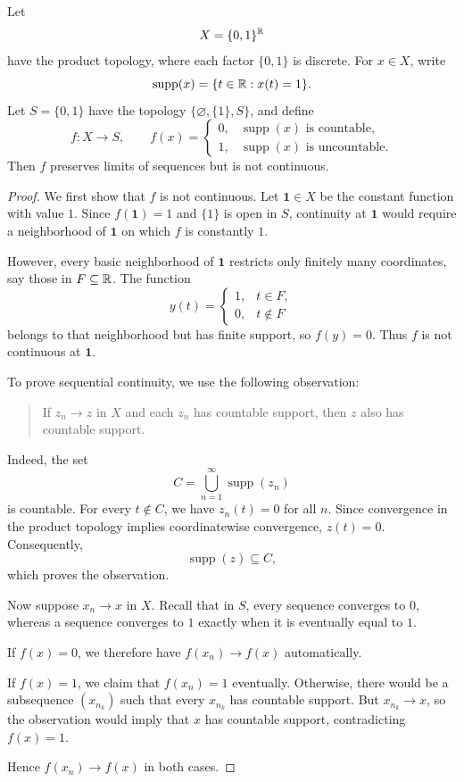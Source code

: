 \begin{example}
Let
\[
X=\{0,1\}^{\mathbb{R}}
\]
have the product topology, where each factor $\{0,1\}$ is discrete. For $x\in X$, write
\[
\operatorname{supp}(x)=\{t\in\mathbb{R}:x(t)=1\}.
\]
Let $S=\{0,1\}$ have the topology $\{\varnothing,\{1\},S\}$, and define
\[
f:X\longrightarrow S,\qquad
f(x)=
\begin{cases}
0,&\operatorname{supp}(x)\text{ is countable},\\
1,&\operatorname{supp}(x)\text{ is uncountable}.
\end{cases}
\]
Then $f$ preserves limits of sequences but is not continuous.

\begin{proof}
We first show that $f$ is not continuous. Let $\mathbf{1}\in X$ be the constant function with value $1$. Since $f(\mathbf{1})=1$ and $\{1\}$ is open in $S$, continuity at $\mathbf{1}$ would require a neighborhood of $\mathbf{1}$ on which $f$ is constantly $1$.

However, every basic neighborhood of $\mathbf{1}$ restricts only finitely many coordinates, say those in $F\subseteq\mathbb{R}$. The function
\[
y(t)=
\begin{cases}
1,&t\in F,\\
0,&t\notin F
\end{cases}
\]
belongs to that neighborhood but has finite support, so $f(y)=0$. Thus $f$ is not continuous at $\mathbf{1}$.

To prove sequential continuity, we use the following observation:
\begin{quote}
If $z_n\to z$ in $X$ and each $z_n$ has countable support, then $z$ also has countable support.
\end{quote}
Indeed, the set
\[
C=\bigcup_{n=1}^{\infty}\operatorname{supp}(z_n)
\]
is countable. For every $t\notin C$, we have $z_n(t)=0$ for all $n$. Since convergence in the product topology implies coordinatewise convergence, $z(t)=0$. Consequently,
\[
\operatorname{supp}(z)\subseteq C,
\]
which proves the observation.

Now suppose $x_n\to x$ in $X$. Recall that in $S$, every sequence converges to $0$, whereas a sequence converges to $1$ exactly when it is eventually equal to $1$.

If $f(x)=0$, we therefore have $f(x_n)\to f(x)$ automatically.

If $f(x)=1$, we claim that $f(x_n)=1$ eventually. Otherwise, there would be a subsequence $(x_{n_k})$ such that every $x_{n_k}$ has countable support. But $x_{n_k}\to x$, so the observation would imply that $x$ has countable support, contradicting $f(x)=1$.

Hence $f(x_n)\to f(x)$ in both cases.
\end{proof}
\end{example}


